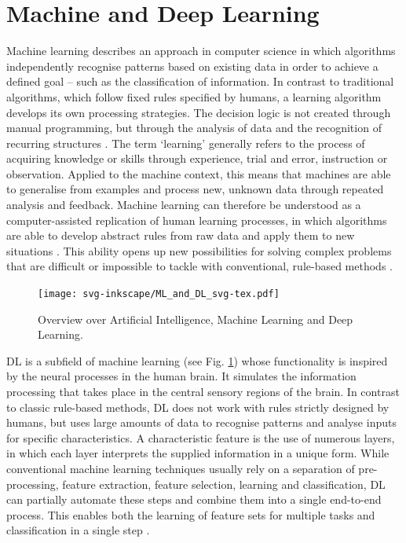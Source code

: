 \section{Machine and Deep Learning}
Machine learning describes an approach in computer science in which algorithms independently recognise patterns based on existing data in order to achieve a defined goal – such as the classification of information. In contrast to traditional algorithms, which follow fixed rules specified by humans, a learning algorithm develops its own processing strategies. The decision logic is not created through manual programming, but through the analysis of data and the recognition of recurring structures \cite{Shetty2022}. The term ‘learning’ generally refers to the process of acquiring knowledge or skills through experience, trial and error, instruction or observation. Applied to the machine context, this means that machines are able to generalise from examples and process new, unknown data through repeated analysis and feedback. Machine learning can therefore be understood as a computer-assisted replication of human learning processes, in which algorithms are able to develop abstract rules from raw data and apply them to new situations \cite {Fischer1999, Braga-Neto2020}. This ability opens up new possibilities for solving complex problems that are difficult or impossible to tackle with conventional, rule-based methods \cite{Goodfellow-et-al-2016}.



\begin{figure}[h]
    \centering
    \texttt{[image: svg-inkscape/ML\_and\_DL\_svg-tex.pdf]}
    \caption{Overview over Artificial Intelligence, Machine Learning and Deep Learning. \cite{Alzubaidi2021}}
    \label{fig:ML_andD_L}
\end{figure}

\acrfull{DL} is a subfield of machine learning (see Fig. \ref{fig:ML_andD_L}) whose functionality is inspired by the neural processes in the human brain. It simulates the information processing that takes place in the central sensory regions of the brain. In contrast to classic rule-based methods, \acrshort{DL} does not work with rules strictly designed by humans, but uses large amounts of data to recognise patterns and analyse inputs for specific characteristics. A characteristic feature is the use of numerous  layers, in which each layer interprets the supplied information in a unique form. While conventional machine learning techniques usually rely on a separation of pre-processing, feature extraction, feature selection, learning and classification, \acrshort{DL} can partially automate these steps and combine them into a single end-to-end process. This enables both the learning of feature sets for multiple tasks and classification in a single step \cite{Alzubaidi2021}.
 
